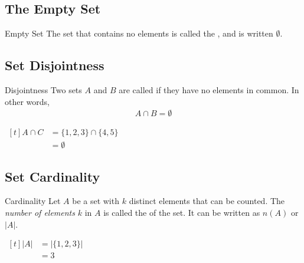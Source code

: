 \documentclass[../notes.tex]{subfiles}
\begin{document}
			\subsection{The Empty Set}
				\begin{definition}{Empty Set}
					The set that contains no elements is called the , and is written $\emptyset$.
				\end{definition}
			\subsection{Set Disjointness}
				\begin{definition}{Disjointness}
					Two sets $A$ and $B$ are called  if they have no elements in common. In other words,
					\begin{align*}
						A \cap B = \emptyset
					\end{align*}
				\end{definition}
				\begin{example}[hbox] $
					\begin{aligned}[t]
						A \cap C &= \{1, 2, 3\} \cap \{4, 5\}\\
						&= \emptyset
					\end{aligned} $
				\end{example}
			\pagebreak
			\subsection{Set Cardinality}
				\begin{definition}{Cardinality}
					Let $A$ be a set with $k$ distinct elements that can be counted. The \emph{number of elements} $k$ in $A$ is called the  of the set. It can be written as $n(A)$ or $\left\lvert A\right\rvert$.
				\end{definition}
				\begin{example}[hbox] $
					\begin{aligned}[t]
						\left\lvert A\right\rvert &= \bigl\lvert \{1, 2, 3\}\bigr\rvert\\
						&= 3
					\end{aligned} $
				\end{example}
\end{document}
